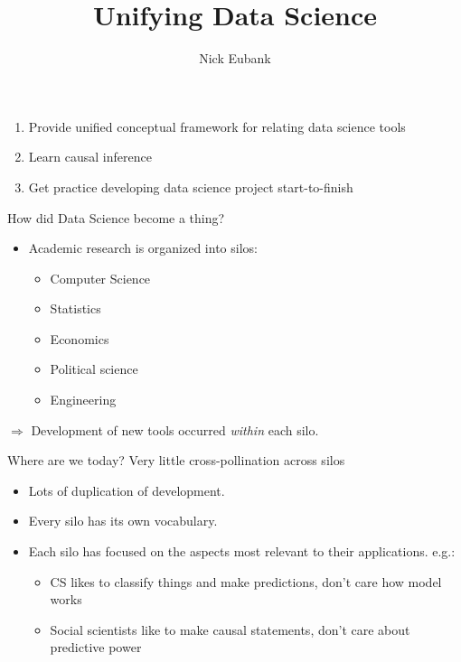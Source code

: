 \documentclass[11pt]{beamer}
\title{Unifying Data Science}
\author{\small Nick Eubank}
\date{\vspace*{.3in} \date}
\begin{document}
\begin{frame}[c]
\maketitle
\end{frame}

\begin{frame}[c]{}
\begin{enumerate}
  \item Provide unified conceptual framework for relating data science tools
  \item Learn causal inference
  \item Get practice developing data science project start-to-finish
\end{enumerate}
\end{frame}

\begin{frame}[c]{How did Data Science become a thing?}

\begin{itemize}
	\pause \item Academic research is organized into silos:
	\pause
	\begin{itemize}
		\item Computer Science
		\item Statistics
		\item Economics
		\item Political science
		\item Engineering
	\end{itemize}
\end{itemize}
\pause $\Rightarrow$ Development of new tools occurred \emph{within} each silo.
\end{frame}


\begin{frame}[c]{Where are we today?}
Very little cross-pollination across silos
\begin{itemize}
	\pause \item Lots of duplication of development.
	\pause \item Every silo has its own vocabulary.
	\pause \item Each silo has focused on the aspects most relevant to their applications. e.g.:
	\begin{itemize}
		\pause \item CS likes to classify things and make predictions, don't care how model works
		\item Social scientists like to make causal statements, don't care about predictive power
	\end{itemize}
\end{itemize}
\end{frame}
\end{document}
